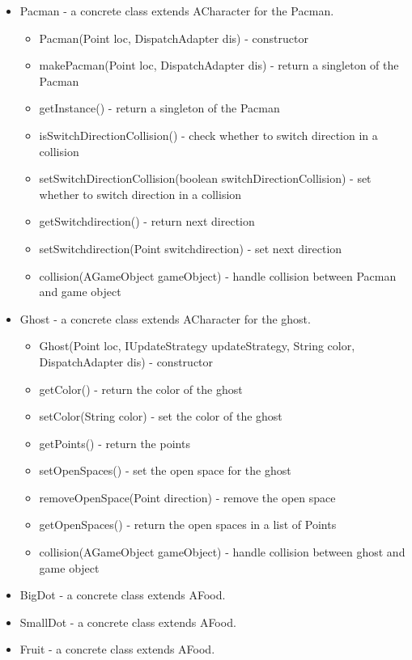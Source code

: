 \documentclass[letterpaper, 11pt]{article}
\begin{document}
\begin{itemize}
 \iffalse
  \item Pacman - a concrete class extends ACharacter for the Pacman. 
  \begin{itemize}
  \item Pacman(Point loc, DispatchAdapter dis) - constructor
  \item makePacman(Point loc, DispatchAdapter dis) - return a singleton of the Pacman
  \item getInstance() - return a singleton of the Pacman
  \item isSwitchDirectionCollision() - check whether to switch direction in a collision
  \item setSwitchDirectionCollision(boolean switchDirectionCollision) - set whether to switch direction in a collision
  \item getSwitchdirection() - return next direction
  \item setSwitchdirection(Point switchdirection) - set next direction
  \item collision(AGameObject gameObject) - handle collision between Pacman and game object
   \end{itemize}
    \item Ghost - a concrete class extends ACharacter for the ghost. 
  \begin{itemize}
  \item Ghost(Point loc, IUpdateStrategy updateStrategy, String color, DispatchAdapter dis) - constructor
   \item getColor() - return the color of the ghost
   \item setColor(String color) - set the color of the ghost
   \item getPoints() - return the points
   \item setOpenSpaces() - set the open space for the ghost
   \item removeOpenSpace(Point direction) - remove the open space
   \item getOpenSpaces() - return the open spaces in a list of Points
  \item collision(AGameObject gameObject) - handle collision between ghost and game object
   \end{itemize}
  \item BigDot - a concrete class extends AFood.
  \item SmallDot - a concrete class extends AFood.
  \item Fruit - a concrete class extends AFood.
  \begin{itemize}

\end{itemize}
\end{itemize}
\end{document}
